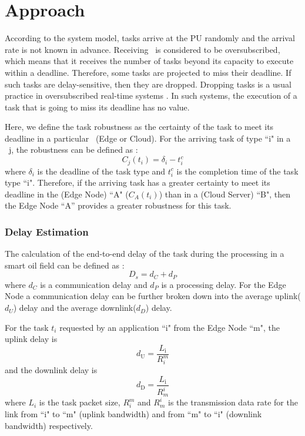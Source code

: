 \graphicspath{ {Figures/} }
\section{Approach}\label{approach}
According to the system model, tasks arrive at the PU randomly and the arrival rate is not known in advance. Receiving \pu~is considered to be oversubscribed, which means that it receives the number of tasks beyond its capacity to execute within a deadline. Therefore, some tasks are projected to miss their deadline. If such tasks are delay-sensitive, then they are dropped. Dropping tasks is a usual practice in oversubscribed real-time systems \cite{khemka2014utility,KHEMKA201514,khemka2015utility}. In such systems, the execution of a task that is going to miss its deadline has no value.

Here, we define the task robustness as the certainty of the task to meet its deadline in a particular \pu~(Edge or Cloud). For the arriving task of type ``i" in a \pu~j, the robustness can be defined as : 
\begin{equation} 
	C_j(t_i) = \delta_i - t_i^c
\end{equation}
where $\delta_i$ is the deadline of the task type and $t_i^c$ is the completion time of the task type ``i". Therefore, if the arriving task has a greater certainty to meet its deadline in the \pu (Edge Node) ``A" ($C_A(t_i)$) than in a \pu (Cloud Server) ``B", then the Edge Node ``A” provides a greater robustness for this task.

\subsubsection{\textbf{Delay Estimation}}
The calculation of the end-to-end delay of the task during the processing in a smart oil field can be defined as :
\begin{equation} 
    D_s = d_C + d_P
\end{equation}
where $d_C$ is a communication delay and $d_P$ is a processing delay. For the Edge Node a communication delay can be further broken down into  the average uplink($d_U$) delay and the average downlink($d_D$) delay. 

For the task $t_i$  requested by an application ``i" from the Edge Node ``m", the uplink delay is \begin{equation} d_\textrm{U} =  \frac{L_\textrm{i}}{R_i^m} \label{eq:2} \end{equation} and the downlink delay is \begin{equation} d_\textrm{D} =  \frac{L_\textrm{i}}{R_m^i} \label{eq:3} \end{equation} where $L_i$  is the task packet size, $R_i^m$ and $R_m^i$ is the transmission data rate for the link from ``i" to ``m" (uplink bandwidth) and from ``m" to ``i" (downlink bandwidth) respectively.

